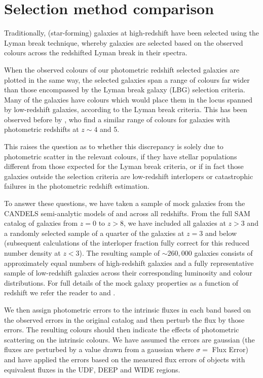 \section{Selection method comparison}\label{smf-sec:selection_comp}
Traditionally, (star-forming) galaxies at high-redshift have been selected using the Lyman break technique, whereby galaxies are selected based on the observed colours across the redshifted Lyman break in their spectra.

When the observed colours of our photometric redshift selected galaxies are plotted in the same way, the selected galaxies span a range of colours far wider than those encompassed by the Lyman break galaxy (LBG) selection criteria. Many of the galaxies have colours which would place them in the locus spanned by low-redshift galaxies, according to the Lyman break criteria. This has been observed before by \citet{2010ApJ...724..425D}, who find a similar range of colours for galaxies with photometric redshifts at $z \sim 4$ and 5.

This raises the question as to whether this discrepancy is solely due to photometric scatter in the relevant colours, if they have stellar populations different from those expected for the Lyman break criteria, or if in fact those galaxies outside the selection criteria are low-redshift interlopers or catastrophic failures in the photometric redshift estimation.

To answer these questions, we have taken a sample of mock galaxies from the CANDELS semi-analytic models of \citet{Somerville:2008ed} and \citet{Somerville:2012cq} across all redshifts. From the full SAM catalog of galaxies from $z = 0$ to $z > 8$, we have included all galaxies at $z > 3$ and a randomly selected sample of a quarter of the galaxies at $z = 3$ and below (subsequent calculations of the interloper fraction fully correct for this reduced number density at $z < 3$). The resulting sample of $\sim 260,000$ galaxies consists of approximately equal numbers of high-redshift galaxies and a fully representative sample of low-redshift galaxies across their corresponding luminosity and colour distributions. For full details of the mock galaxy properties as a function of redshift we refer the reader to \citet{Somerville:2008ed} and \citet{Lu:2014kl}.

We then assign photometric errors to the intrinsic fluxes in each band based on the observed errors in the original catalog and then perturb the flux by those errors. The resulting colours should then indicate the effects of photometric scattering on the intrinsic colours. We have assumed the errors are gaussian (the fluxes are perturbed by a value drawn from a gaussian where $\sigma =$ Flux Error) and have applied the errors based on the measured flux errors of objects with equivalent fluxes in the UDF, DEEP and WIDE regions. 

